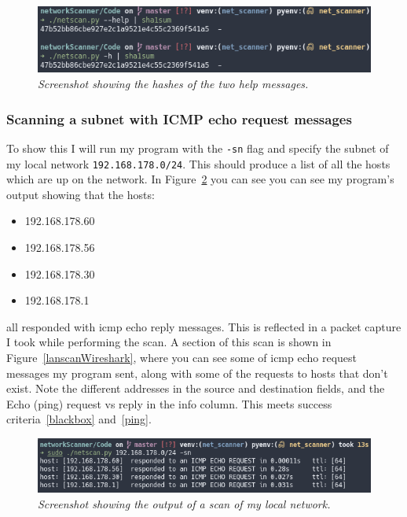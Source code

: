 \documentclass[titlepage]{article}
\let\Oldsubsubsection\subsubsection{}
\renewcommand{\subsubsection}{\FloatBarrier\Oldsubsubsection}
\begin{document}
\begin{figure}[H]
  \centering
  \includegraphics[width=\textwidth]{messagehashes.png}
  \caption{\textit{%
    Screenshot showing the hashes of the two help messages.
}}\label{messagehash}
\end{figure}

\subsubsection{Scanning a subnet with ICMP echo request messages}
To show this I will run my program with the \verb|-sn| flag and specify the
subnet of my local network \verb|192.168.178.0/24|.
This should produce a list of all the hosts which are up on the network.
In Figure~\ref{lanscantest} you can see you can see my program's output
showing that the hosts:
\begin{itemize}
  \item{192.168.178.60}
  \item{192.168.178.56}
  \item{192.168.178.30}
  \item{192.168.178.1}
\end{itemize}
all responded with \gls{icmp} echo reply messages.
This is reflected in a packet capture I took while performing the scan.
A section of this scan is shown in Figure~\ref{lanscanWireshark},
where you can see some of \gls{icmp} echo request messages my program sent,
along with some of the requests to hosts that don't exist.
Note the different addresses in the source and destination fields,
and the Echo (ping) request vs reply in the info column.
This meets success criteria~\ref{blackbox} and~\ref{ping}.

\begin{figure}[H]
  \centering
  \includegraphics[width=\textwidth]{pingscantest.png}
  \caption{\textit{%
    Screenshot showing the output of a scan of my local network.
}}\label{lanscantest}
\end{figure}
\end{document}
